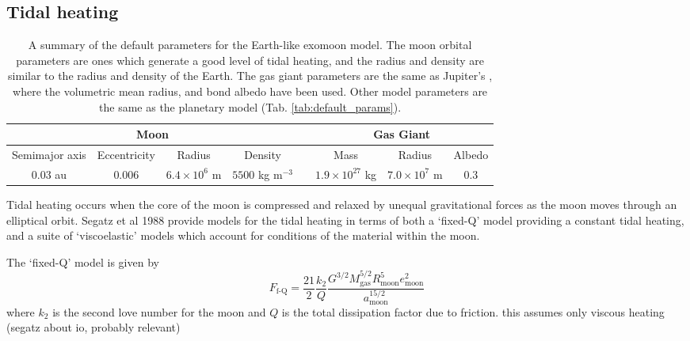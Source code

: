 \documentclass[12pt, onecolumn]{revtex4-2}    %
\begin{document}
\subsection{Tidal heating} \label{ssec:InvTidalHeating}
\begin{table*}
  \begin{tabular}{|c|c|c|c|c|c|c|c|}
    \hline
    \multicolumn{4}{|c|}{Moon} && \multicolumn{3}{c|}{Gas Giant} \\
    \hline
    Semimajor axis & Eccentricity & Radius & Density && Mass & Radius & Albedo \\
    \hline
    $0.03$ au & $0.006$ & $6.4\times 10^6$ m & $5500$ kg m$^{-3}$ && $1.9\times10^{27}$ kg & $7.0 \times 10^7$ m & 0.3 \\
    \hline
  \end{tabular}
  \caption{
    A summary of the default parameters for the Earth-like exomoon model.
    The moon orbital parameters are ones which generate a good level of tidal heating,
    and the radius and density are similar to the radius and density of the Earth.
    The gas giant parameters are the same as Jupiter's \cite{NASA_jupiter}, where the volumetric mean radius, and bond albedo have been used.
    Other model parameters are the same as the planetary model (Tab. \ref{tab:default_params}).
  }
  \label{tab:default_params_moon}
\end{table*}

Tidal heating occurs when the core of the moon is compressed and relaxed by unequal gravitational forces as the moon moves through an elliptical orbit. 
Segatz et al 1988 \cite{Segatz1988} provide models for the tidal heating in terms of both a `fixed-Q' model providing a constant tidal heating, and a suite of `viscoelastic' models which account for conditions of the material within the moon.

The `fixed-Q' model is given by
\begin{equation}
  F_\text{f-Q} = \frac{21}{2} \frac{k_2}{Q} \frac{G^{3/2} M_\text{gas}^{5/2} R_\text{moon}^5 e_\text{moon}^2} {a_\text{moon}^{15/2}}
\end{equation}
where $k_2$ is the second love number for the moon and $Q$ is the total dissipation factor due to friction.
this assumes only viscous heating (segatz about io, probably relevant)
\end{document}
